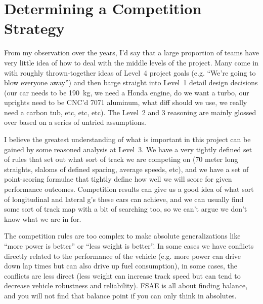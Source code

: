 \documentclass[10pt, a4paper, article, oneside, twocolumn, final]{memoir}
\begin{document}
\section*{Determining a Competition Strategy}

From my observation over the years, I’d say that a large proportion of teams have very little idea of how to deal with the middle levels of the project. Many come in with roughly thrown-together ideas of Level~4 project goals (e.g. “We’re going to blow everyone away”) and then barge straight into Level~1 detail design decisions (our car needs to be \SI{190}{\kilogram}, we need a Honda engine, do we want a turbo, our uprights need to be CNC'd 7071 aluminum, what diff should we use, we really need a carbon tub, etc, etc, etc). The Level~2 and 3 reasoning are mainly glossed over based on a series of untried assumptions. 

I believe the greatest understanding of what is important in this project can be gained by some reasoned analysis at Level~3. We have a very tightly defined set of rules that set out what sort of track we are competing on (\num{70} meter long straights, slaloms of defined spacing, average speeds, etc), and we have a set of point-scoring formulae that tightly define how well we will score for given performance outcomes. Competition results can give us a good idea of what sort of longitudinal and lateral g’s these cars can achieve, and we can usually find some sort of track map with a bit of searching too, so we can’t argue we don’t know what we are in for. 

The competition rules are too complex to make absolute generalizations like “more power is better” or “less weight is better”. In some cases we have conflicts directly related to the performance of the vehicle (e.g. more power can drive down lap times but can also drive up fuel consumption), in some cases, the conflicts are less direct (less weight can increase track speed but can tend to decrease vehicle robustness and reliability). FSAE is all about finding balance, and you will not find that balance point if you can only think in absolutes.
\end{document}
